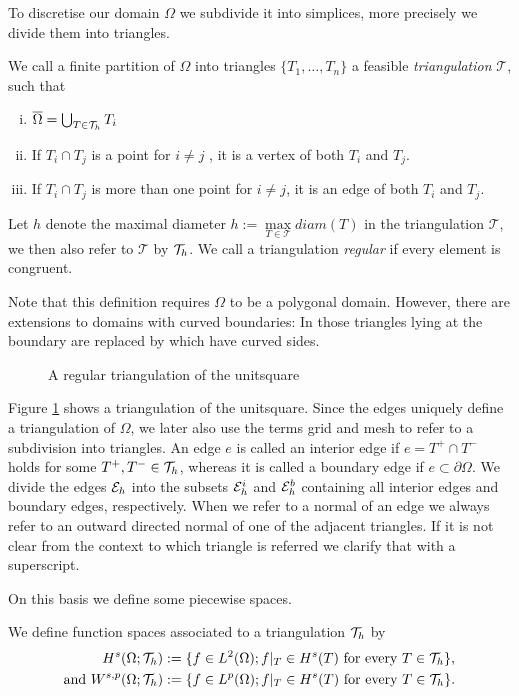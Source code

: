 To discretise our domain $\Omega$ we subdivide it into simplices, more precisely we divide them into triangles.
\begin{definition}
	We call a finite partition of $\Omega$ into triangles $\{T_1, \dots, T_n\}$ a feasible \emph{triangulation} $\mathcal{T}$, such that
	\begin{enumerate}[(i)]
		\item	$\overline \Omega = \bigcup_{T \in \mathcal{T}_h} T_i$
		\item If $T_i \cap T_j$ is a point for $i \neq j$ , it is a vertex of both $T_i$ and $T_j$.
		\item If $T_i \cap T_j$ is more than one point for $i \neq j$, it is an edge of both $T_i$ and $T_j$.
	\end{enumerate}
	Let $h$ denote the maximal diameter $h:= \operatorname{max}\limits_{T\in \mathcal T} diam(T)$ in the triangulation $\mathcal T$, we then also refer to $\mathcal{T}$ by $\mathcal{T}_h$. We call a triangulation \emph{regular} if every element is congruent.
\end{definition}
Note that this definition requires $\Omega$ to be a polygonal domain. However, there are extensions to domains with curved boundaries: In those triangles lying at the boundary are replaced by  which have curved sides. 

\begin{figure}[H]

\caption{A regular triangulation of the unitsquare}
 \label{fig: triangulation}
\end{figure}

Figure \ref{fig: triangulation} shows a triangulation of the unitsquare. Since the edges uniquely define a triangulation of $\Omega$, we later also use the terms grid and mesh to refer to a subdivision into triangles.
An edge $e$ is called an interior edge if $e=T^+ \cap T^-$ holds for some $T^+,T^- \in \mathcal{T}_h$, whereas it is called a boundary edge if $e \subset \partial \Omega$.
We divide the edges $\mathcal{E}_h$ into the subsets $\mathcal{E}_h^i$ and $\mathcal{E}_h^b$ containing all interior edges and boundary edges, respectively. 
When we refer to a normal of an edge we always refer to an outward directed normal of one of the adjacent triangles. If it is not clear from the context to which triangle is referred we clarify that with a superscript.

On this basis we define some piecewise spaces.
\begin{definition}
We define function spaces associated to a triangulation $\mathcal{T}_h$ by
\begin{align*}
	H^s(\Omega;\mathcal{T}_h) &:= \{f \in L^2(\Omega); f|_T \in H^s(T) \text{ for every } T \in \mathcal{T}_h\}, \\
	\text{and }
	W^{s,p}(\Omega;\mathcal{T}_h) &:= \{f \in L^p(\Omega); f|_T \in H^s(T) \text{ for every } T \in \mathcal{T}_h\}.
\end{align*}	
\end{definition}

